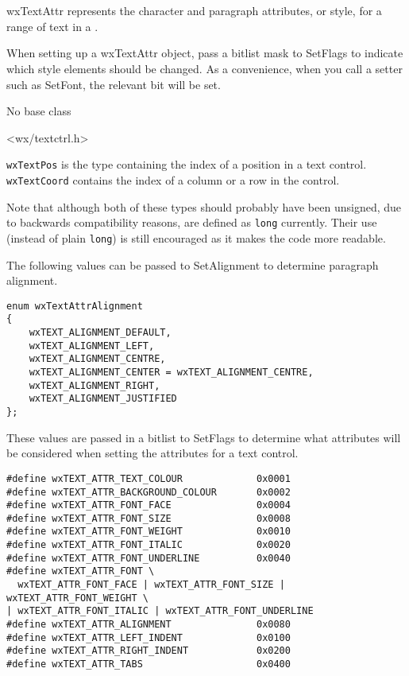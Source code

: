 
\section{}\label{wxtextattr}

wxTextAttr represents the character and paragraph attributes, or style, for a range of text in a\rtfsp
{}.

When setting up a wxTextAttr object, pass a bitlist mask to SetFlags to indicate
which style elements should be changed. As a convenience, when you call a
setter such as SetFont, the relevant bit will be set.


No base class


<wx/textctrl.h>


\texttt{wxTextPos} is the type containing the index of a position in a text
control. \texttt{wxTextCoord} contains the index of a column or a row in the
control.

Note that although both of these types should probably have been unsigned, due
to backwards compatibility reasons, are defined as \texttt{long} currently.
Their use (instead of plain \texttt{long}) is still encouraged as it makes the
code more readable.


The following values can be passed to SetAlignment to determine
paragraph alignment.

{\small
\begin{verbatim}
enum wxTextAttrAlignment
{
    wxTEXT_ALIGNMENT_DEFAULT,
    wxTEXT_ALIGNMENT_LEFT,
    wxTEXT_ALIGNMENT_CENTRE,
    wxTEXT_ALIGNMENT_CENTER = wxTEXT_ALIGNMENT_CENTRE,
    wxTEXT_ALIGNMENT_RIGHT,
    wxTEXT_ALIGNMENT_JUSTIFIED
};
\end{verbatim}
}

These values are passed in a bitlist to SetFlags to determine
what attributes will be considered when setting the attributes
for a text control.

{\small
\begin{verbatim}
#define wxTEXT_ATTR_TEXT_COLOUR             0x0001
#define wxTEXT_ATTR_BACKGROUND_COLOUR       0x0002
#define wxTEXT_ATTR_FONT_FACE               0x0004
#define wxTEXT_ATTR_FONT_SIZE               0x0008
#define wxTEXT_ATTR_FONT_WEIGHT             0x0010
#define wxTEXT_ATTR_FONT_ITALIC             0x0020
#define wxTEXT_ATTR_FONT_UNDERLINE          0x0040
#define wxTEXT_ATTR_FONT \
  wxTEXT_ATTR_FONT_FACE | wxTEXT_ATTR_FONT_SIZE | wxTEXT_ATTR_FONT_WEIGHT \
| wxTEXT_ATTR_FONT_ITALIC | wxTEXT_ATTR_FONT_UNDERLINE
#define wxTEXT_ATTR_ALIGNMENT               0x0080
#define wxTEXT_ATTR_LEFT_INDENT             0x0100
#define wxTEXT_ATTR_RIGHT_INDENT            0x0200
#define wxTEXT_ATTR_TABS                    0x0400
\end{verbatim}
}


